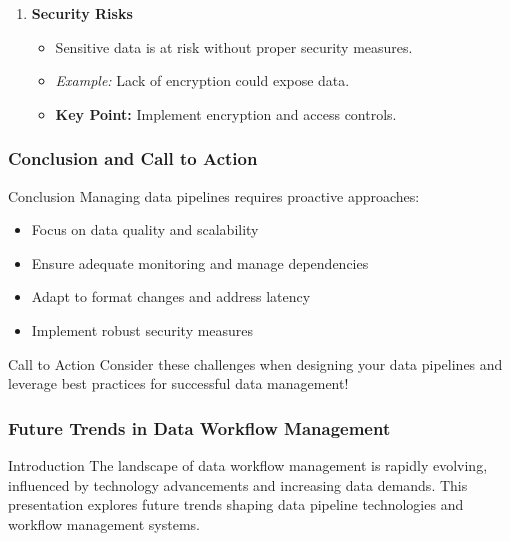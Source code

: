 \documentclass[aspectratio=169]{beamer}
\begin{document}
\begin{frame}[fragile]
\begin{enumerate}
        \item \textbf{Security Risks}
            \begin{itemize}
                \item Sensitive data is at risk without proper security measures.
                \item \textit{Example:} Lack of encryption could expose data.
                \item \textbf{Key Point:} Implement encryption and access controls.
            \end{itemize}
    \end{enumerate}
\end{frame}

\begin{frame}[fragile]
    \frametitle{Conclusion and Call to Action}
    \begin{block}{Conclusion}
        Managing data pipelines requires proactive approaches:
        \begin{itemize}
            \item Focus on data quality and scalability
            \item Ensure adequate monitoring and manage dependencies
            \item Adapt to format changes and address latency
            \item Implement robust security measures
        \end{itemize}
    \end{block}
    \begin{block}{Call to Action}
        Consider these challenges when designing your data pipelines
        and leverage best practices for successful data management!
    \end{block}
\end{frame}

\begin{frame}[fragile]
    \frametitle{Future Trends in Data Workflow Management}
    \begin{block}{Introduction}
        The landscape of data workflow management is rapidly evolving, influenced by technology advancements and increasing data demands. This presentation explores future trends shaping data pipeline technologies and workflow management systems.
    \end{block}
\end{frame}
\end{document}

